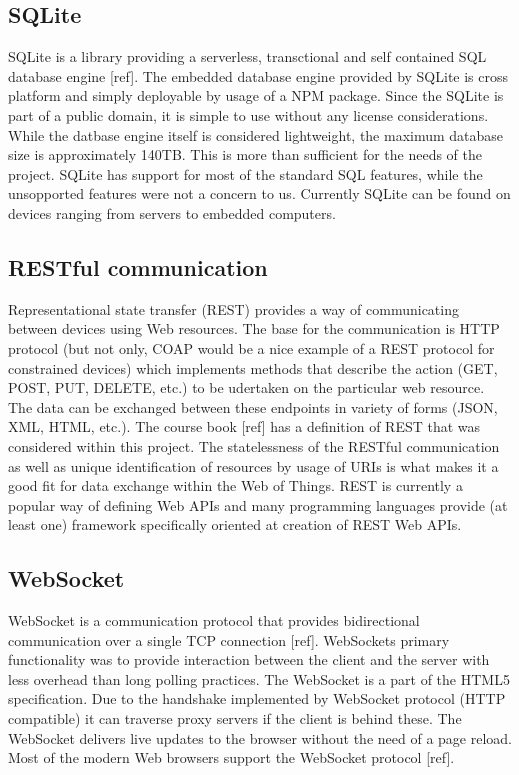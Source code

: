 \subsection{SQLite}
\label{subsec:sqlite}
SQLite is a library providing a serverless, transctional and self contained SQL database engine [ref]. The embedded database engine provided by SQLite is cross platform and simply deployable by usage of a NPM package. Since the SQLite is part of a public domain, it is simple to use without any license considerations. While the datbase engine itself is considered lightweight, the maximum database size is approximately 140TB. This is more than sufficient for the needs of the project. SQLite has support for most of the standard SQL features, while the unsopported features were not a concern to us. Currently SQLite can be found on devices ranging from servers to embedded computers.

\subsection{RESTful communication}
\label{subsec:rest}
Representational state transfer (REST) provides a way of communicating between devices using Web resources. The base for the communication is HTTP protocol (but not only, COAP would be a nice example of a REST protocol for constrained devices) which implements methods that describe the action (GET, POST, PUT, DELETE, etc.) to be udertaken on the particular web resource. The data can be exchanged between these endpoints in variety of forms (JSON, XML, HTML, etc.). The course book [ref] has a definition of REST that was considered within this project. The statelessness of the RESTful communication as well as unique identification of resources by usage of URIs is what makes it a good fit for data exchange within the Web of Things. REST is currently a popular way of defining Web APIs and many programming languages provide (at least one) framework specifically oriented at creation of REST Web APIs.


\subsection{WebSocket}
\label{subsec:websocket}
WebSocket is a communication protocol that provides bidirectional communication over a single TCP connection [ref]. WebSockets primary functionality was to provide interaction between the client and the server with less overhead than long polling practices. The WebSocket is a part of the HTML5 specification. Due to the handshake implemented by WebSocket protocol (HTTP compatible) it can traverse proxy servers if the client is behind these. The WebSocket delivers live updates to the browser without the need of a page reload. Most of the modern Web browsers support the WebSocket protocol [ref].

